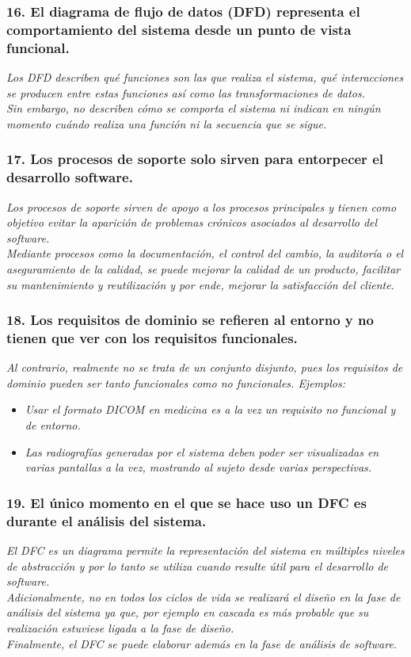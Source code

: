 \subsubsection*{16. El diagrama de flujo de datos (DFD) representa el comportamiento del sistema desde un punto de vista funcional.}
\textit{Los DFD describen qué funciones son las que realiza el sistema, qué interacciones se producen entre estas funciones así como las transformaciones de datos.
\\
Sin embargo, no describen cómo se comporta el sistema ni indican en ningún momento cuándo realiza una función ni la secuencia que se sigue.
}

\subsubsection*{17. Los procesos de soporte solo sirven para entorpecer el desarrollo software.}
\textit{Los procesos de soporte sirven de apoyo a los procesos principales y tienen como objetivo evitar la aparición de problemas crónicos asociados al desarrollo del software.\\
Mediante procesos como la documentación, el control del cambio, la auditoría o el aseguramiento de la calidad, se puede mejorar la calidad de un producto, facilitar su mantenimiento y reutilización y por ende, mejorar la satisfacción del cliente.
}

\subsubsection*{18. Los requisitos de dominio se refieren al entorno y no tienen que ver con los requisitos funcionales.}
\textit{Al contrario, realmente no se trata de un conjunto disjunto, pues los requisitos de dominio pueden ser tanto funcionales como no funcionales. Ejemplos:
}
\begin{itemize}
    \item \textit{Usar el formato DICOM en medicina es a la vez un requisito no funcional y de entorno.}
    \item \textit{Las radiografías generadas por el sistema deben poder ser visualizadas en varias pantallas a la vez, mostrando al sujeto desde varias perspectivas. }
\end{itemize}


\subsubsection*{19. El único momento en el que se hace uso un DFC es durante el análisis del sistema.}
\textit{El DFC es un diagrama permite la representación del sistema en múltiples niveles de abstracción y por lo tanto se utiliza cuando resulte útil para el desarrollo de software.
\\
Adicionalmente, no en todos los ciclos de vida se realizará el diseño en la fase de análisis del sistema ya que, por ejemplo en cascada es más probable que su realización estuviese ligada a la fase de diseño.
\\
Finalmente, el DFC se puede elaborar además en la fase de análisis de software. 
}

